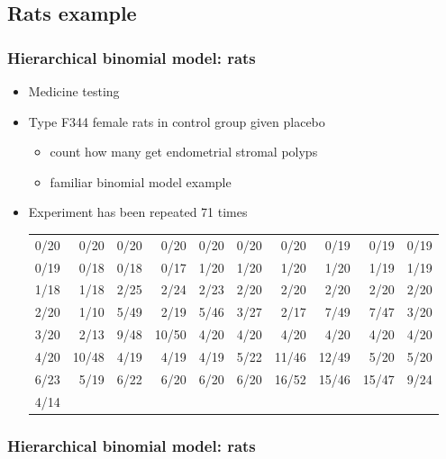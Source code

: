 \documentclass[10pt]{beamer}
\begin{document}
\subsection{Rats example}

\begin{frame}

\frametitle{Hierarchical binomial model: rats}

  \begin{itemize}
  \item Medicine testing
  \item Type F344 female rats in control group given placebo
    \begin{itemize}
    \item count how many get endometrial stromal polyps
    \item familiar binomial model example
    \end{itemize}
  \item<2-> Experiment has been repeated 71 times
    {\tiny
      \begin{tabular}{r r r r r r r r r r}
        0/20 & 0/20 & 0/20 & 0/20 & 0/20 & 0/20 & 0/20 & 0/19 & 0/19 & 0/19 \\
        0/19 & 0/18 & 0/18 & 0/17 & 1/20 & 1/20 & 1/20 & 1/20 & 1/19 & 1/19 \\
        1/18 & 1/18 & 2/25 & 2/24 & 2/23 & 2/20 & 2/20 & 2/20 & 2/20 & 2/20 \\
        2/20 & 1/10 & 5/49 & 2/19 & 5/46 & 3/27 & 2/17 & 7/49 & 7/47 & 3/20 \\
        3/20 & 2/13 & 9/48 & 10/50 & 4/20 & 4/20 & 4/20 & 4/20 & 4/20 & 4/20 \\
        4/20 & 10/48 & 4/19 & 4/19 & 4/19 & 5/22 & 11/46 & 12/49 & 5/20 & 5/20 \\
        6/23 & 5/19 & 6/22 & 6/20 & 6/20 & 6/20 & 16/52 & 15/46 & 15/47 & 9/24 \\
        4/14 &      &      &      &      &      &       &       &       &
      \end{tabular}}
  \end{itemize}

\end{frame}

\begin{frame}

\frametitle{Hierarchical binomial model: rats}



\end{frame}
\end{document}
